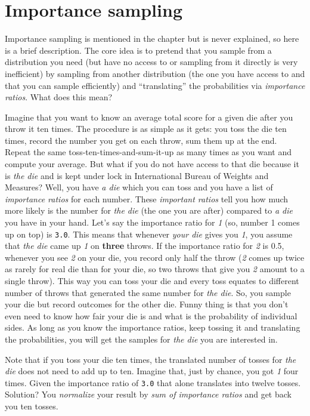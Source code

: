 \documentclass[
]{book}
\begin{document}
\hypertarget{importance-sampling}{%
\section{Importance sampling}\label{importance-sampling}}

Importance sampling is mentioned in the chapter but is never explained, so here is a brief description. The core idea is to pretend that you sample from a distribution you need (but have no access to or sampling from it directly is very inefficient) by sampling from another distribution (the one you have access to and that you can sample efficiently) and ``translating'' the probabilities via \emph{importance ratios}. What does this mean?

Imagine that you want to know an average total score for a given die after you throw it ten times. The procedure is as simple as it gets: you toss the die ten times, record the number you get on each throw, sum them up at the end. Repeat the same toss-ten-times-and-sum-it-up as many times as you want and compute your average. But what if you do not have access to that die because it is \emph{the die} and is kept under lock in International Bureau of Weights and Measures? Well, you have \emph{a die} which you can toss and you have a list of \emph{importance ratios} for each number. These \emph{important ratios} tell you how much more likely is the number for \emph{the die} (the one you are after) compared to \emph{a die} you have in your hand. Let's say the importance ratio for \emph{1} (so, number 1 comes up on top) is \texttt{3.0}. This means that whenever \emph{your die} gives you \emph{1}, you assume that \emph{the die} came up \emph{1} on \textbf{three} throws. If the importance ratio for \emph{2} is 0.5, whenever you see \emph{2} on your die, you record only half the throw (\emph{2} comes up twice as rarely for real die than for your die, so two throws that give you \emph{2} amount to a single throw). This way you can toss your die and every toss equates to different number of throws that generated the same number for \emph{the die}. So, you sample your die but record outcomes for the other die. Funny thing is that you don't even need to know how fair your die is and what is the probability of individual sides. As long as you know the importance ratios, keep tossing it and translating the probabilities, you will get the samples for \emph{the die} you are interested in.

Note that if you toss your die ten times, the translated number of tosses for \emph{the die} does not need to add up to ten. Imagine that, just by chance, you got \emph{1} four times. Given the importance ratio of \texttt{3.0} that alone translates into twelve tosses. Solution? You \emph{normalize} your result by \emph{sum of importance ratios} and get back you ten tosses.
\end{document}

